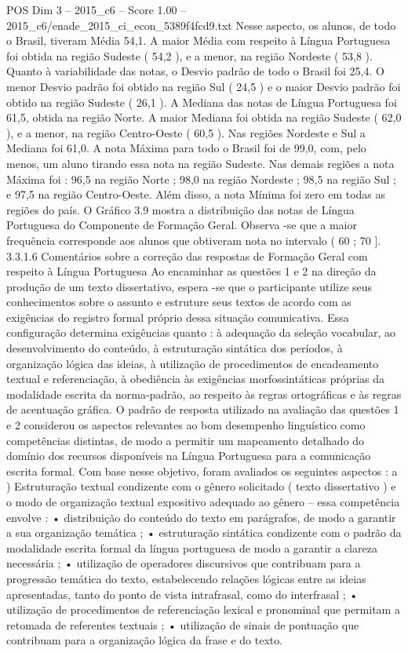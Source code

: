 \begin{textsample}{POS Dim 3 – 2015\_c6 – Score 1.00 – 2015\_c6/enade\_2015\_ci\_econ\_5389f4fcd9.txt}
Nesse aspecto, os alunos, de todo o Brasil, tiveram Média 54,1.
A maior Média com respeito à Língua Portuguesa foi obtida na região Sudeste ( 54,2 ), e a menor, na região Nordeste ( 53,8 ).
Quanto à variabilidade das notas, o Desvio padrão de todo o Brasil foi 25,4.
O menor Desvio padrão foi obtido na região Sul ( 24,5 ) e o maior Desvio padrão foi obtido na região Sudeste ( 26,1 ).
A Mediana das notas de Língua Portuguesa foi 61,5, obtida na região Norte.
A maior Mediana foi obtida na região Sudeste ( 62,0 ), e a menor, na região Centro-Oeste ( 60,5 ).
Nas regiões Nordeste e Sul a Mediana foi 61,0.
A nota Máxima para todo o Brasil foi de 99,0, com, pelo menos, um aluno tirando essa nota na região Sudeste.
Nas demais regiões a nota Máxima foi : 96,5 na região Norte ; 98,0 na região Nordeste ; 98,5 na região Sul ; e 97,5 na região Centro-Oeste.
Além disso, a nota Mínima foi zero em todas as regiões do país.
O Gráfico 3.9 mostra a distribuição das notas de Língua Portuguesa do Componente de Formação Geral.
Observa -se que a maior frequência corresponde aos alunos que obtiveram nota no intervalo ( 60 ; 70 ]. 3.3.1.6 Comentários sobre a correção das respostas de Formação Geral com respeito à Língua Portuguesa Ao encaminhar as questões 1 e 2 na direção da produção de um texto dissertativo, espera -se que o participante utilize seus conhecimentos sobre o assunto e estruture seus textos de acordo com as exigências do registro formal próprio dessa situação comunicativa.
Essa configuração determina exigências quanto : à adequação da seleção vocabular, ao desenvolvimento do conteúdo, à estruturação sintática dos períodos, à organização lógica das ideias, à utilização de procedimentos de encadeamento textual e referenciação, à obediência às exigências morfossintáticas próprias da modalidade escrita da norma-padrão, ao respeito às regras ortográficas e às regras de acentuação gráfica.
O padrão de resposta utilizado na avaliação das questões 1 e 2 considerou os aspectos relevantes ao bom desempenho linguístico como competências distintas, de modo a permitir um mapeamento detalhado do domínio dos recursos disponíveis na Língua Portuguesa para a comunicação escrita formal.
Com base nesse objetivo, foram avaliados os seguintes aspectos : a ) Estruturação textual condizente com o gênero solicitado ( texto dissertativo ) e o modo de organização textual expositivo adequado ao gênero – essa competência envolve : • distribuição do conteúdo do texto em parágrafos, de modo a garantir a sua organização temática ; • estruturação sintática condizente com o padrão da modalidade escrita formal da língua portuguesa de modo a garantir a clareza necessária ; • utilização de operadores discursivos que contribuam para a progressão temática do texto, estabelecendo relações lógicas entre as ideias apresentadas, tanto do ponto de vista intrafrasal, como do interfrasal ; • utilização de procedimentos de referenciação lexical e pronominal que permitam a retomada de referentes textuais ; • utilização de sinais de pontuação que contribuam para a organização lógica da frase e do texto.

\end{textsample}
